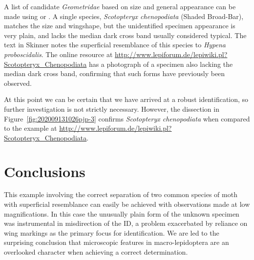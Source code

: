 \documentclass[]{article}
\begin{document}
A list of candidate \textit{Geometridae} based on size and general appearance can be made using  \citet{Skinner1984} or \citet{Waring2018}. A single species, \textit{Scotopteryx chenopodiata} (Shaded Broad-Bar),  matches the size and wingshape,  but the unidentified specimen appearance is very plain,  and lacks the median dark cross band usually considered typical. The text in Skinner notes the superficial resemblance of this species to \textit{Hypena proboscidalis}. The online resource at \url{http://www.lepiforum.de/lepiwiki.pl?Scotopteryx_Chenopodiata} has a photograph of a specimen also lacking the median dark cross band, confirming that such forms have previously been observed.

At this point we can be certain that we have arrived at a robust identification, so further investigation is not strictly necessary. However, 
the dissection in Figure~\ref{fig:202009131026pjp-3}  confirms \textit{Scotopteryx chenopodiata} when compared to the example at \url{http://www.lepiforum.de/lepiwiki.pl?Scotopteryx_Chenopodiata}.

\section*{Conclusions}
This example involving the correct separation of two common species of moth with superficial resemblance can easily be achieved with observations made at low magnifications. In this case the unusually plain form of the unknown specimen was instrumental in misdirection of the ID, a problem exacerbated by reliance on wing markings as the primary focus for identification.
We are led to the surprising conclusion that microscopic features in macro-lepidoptera are an overlooked character when achieving a correct determination.
\end{document}
